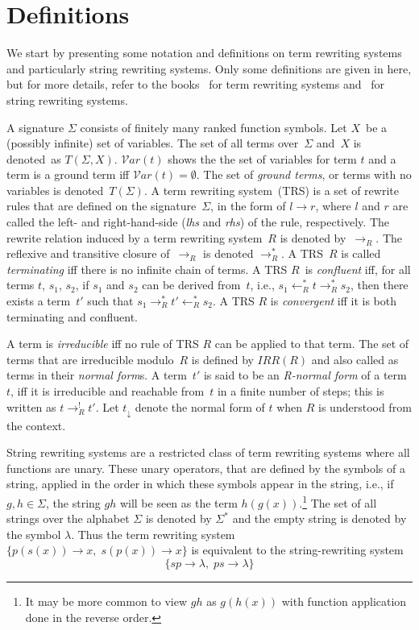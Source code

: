 \documentclass{lmcs} %
\theoremstyle{plain}\newtheorem{satz}[thm]{Satz} %
\newcommand{\Var}{\mathcal{V}\!\mathit{ar}}
\begin{document}
\section*{Definitions}\label{S:defns}
We start by presenting some notation and definitions on term rewriting
systems and particularly string rewriting systems. Only some
definitions are given in here, but for more details, refer to the
books~\cite{Term} for term rewriting systems and~\cite{Botto} for
string rewriting systems.

A signature $\Sigma$ consists of finitely many ranked function symbols.
Let $X$~be a (possibly infinite) set of variables. The set
of all terms over~$\Sigma$ and~$X$ is denoted~as $T(\Sigma, X)$. 
$\Var(t)$ shows the the set of variables for term $t$ and a term is a ground term iff $\Var(t) = \emptyset$. 
The set of \emph{ground terms}, or terms with no variables
is denoted~$T(\Sigma)$.
A term
rewriting system~(TRS) is a set of rewrite rules that are defined on
the signature~$\Sigma$, in the form of $l \rightarrow r$, 
where $l$ and $r$
are called the left- and right-hand-side (\emph{lhs} and \emph{rhs}) of
the rule, respectively. The rewrite relation induced by
a term rewriting system~$R$ is denoted by~$\rightarrow_R^{}$. 
The reflexive
and transitive closure of~$\rightarrow_R^{}$ is denoted
$\rightarrow_R^{*}$. A TRS~$R$
is called \emph{terminating} iff there is no infinite chain of terms.
A TRS $R$~is \emph{confluent} iff, for all terms $t$,
$s_1$, $s_2$, if $s_1$ and $s_2$ can be derived from~$t$, i.e.,
$s_1 \leftarrow_R^{*} t \rightarrow_R^{*} s_2$, then there exists a 
term~$t'$ such that $s_1 \rightarrow_R^{*} t' \leftarrow_R^{*} s_2$.  A TRS
$R$ is \emph{convergent\/} iff it is both terminating and confluent.

A term is \emph{irreducible} iff no rule of TRS $R$ can be
applied to that term. The set of terms that are irreducible modulo~$R$
is defined by $IRR(R)$ and also called as terms in their \emph{normal
  form}s.  A term~$t'$ is said to be an \emph{R-normal form} of a term
$t$, iff it is irreducible and reachable from~$t$ in a finite number
of steps; this is written as $t \rightarrow_{R}^{!} t'$. Let $t_\downarrow$
denote the normal form of $t$ when $R$ is understood from the context.

String rewriting systems are a restricted class of term rewriting
systems where all functions are unary. These unary operators, that are
defined by the symbols of a string, applied in the order in which
these symbols appear in the string, i.e., if $g, h \in \Sigma$, the
string $gh$ will be seen as the term $h(g(x))$.\footnote{
  It may be more common to view $gh$ as $g(h(x))$ with
  function application done in the reverse order.
  } The set of all strings
over the alphabet $\Sigma$ is denoted by $\Sigma^*$ and the empty
string is denoted by the symbol $\lambda$. Thus the term rewriting system
$\{ p(s(x)) \rightarrow x , \; s(p(x)) \rightarrow x \}$ is equivalent to
the string-rewriting system \[ \{ sp \rightarrow \lambda , \;
ps \rightarrow \lambda \} \]
\end{document}
